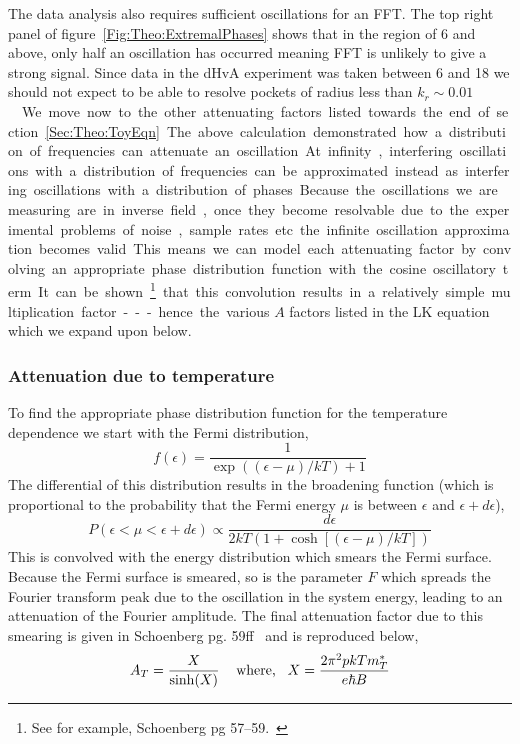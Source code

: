 The data analysis also requires sufficient oscillations for an \ac{FFT}. The top right panel of figure~\ref{Fig:Theo:ExtremalPhases} shows that in the region of \unit{6}{\tesla} and above, only half an oscillation has occurred meaning \ac{FFT} is unlikely to give a strong signal. Since data in the \ac{dHvA} experiment was taken between \unit{6}{\tesla} and \unit{18}{\tesla} we should not expect to be able to resolve pockets of radius less than \unit{$k_r\sim 0.01$}{\reciprocal\angstrom}.

We move now to the other attenuating factors listed towards the end of section~\ref{Sec:Theo:ToyEqn}. The above calculation demonstrated how a distribution of frequencies can attenuate an oscillation. At infinity, interfering oscillations with a distribution of frequencies can be approximated instead as interfering oscillations with a distribution of phases. Because the oscillations we are measuring are in inverse field, once they become resolvable due to the experimental problems of noise, sample rates etc. the infinite oscillation approximation becomes valid. This means we can model each attenuating factor by convolving an appropriate phase distribution function with the cosine oscillatory term. It can be shown\footnote{See for example, Schoenberg pg 57--59.~\cite{Schoenberg1984}} that this convolution results in a relatively simple multiplication factor --- hence the various $A$ factors listed in the \ac{LK} equation which we expand upon below.

\subsubsection{Attenuation due to temperature}

To find the appropriate phase distribution function for the temperature dependence we start with the Fermi distribution,
\begin{equation}
\label{Eqn:Theo:FermiFunction}
f(\epsilon) = \frac{1}{\exp\left((\epsilon-\mu)/kT\right) + 1}
\end{equation} 
The differential of this distribution results in the broadening function (which is proportional to the probability that the Fermi energy $\mu$ is between $\epsilon$ and $\epsilon + d\epsilon$),
\begin{equation}
  P(\epsilon < \mu < \epsilon + d\epsilon) \propto \frac{d\epsilon}{2kT(1 + \cosh[(\epsilon - \mu)/kT])}
\end{equation}
This is convolved with the energy distribution which smears the Fermi surface. Because the Fermi surface is smeared, so is the parameter $F$ which spreads the Fourier transform peak due to the oscillation in the system energy, leading to an attenuation of the Fourier amplitude. The final attenuation factor due to this smearing is given in Schoenberg pg. 59ff~\cite{Schoenberg1984} and is reproduced below,
\begin{equation}
\label{Eqn:Theo:TemperatureTerm}
  A_T = \frac{X}{\sinh(X)} \textrm{\hspace{0.3cm} where,\hspace{0.3cm}} X = \frac{2\pi^2pkT m^*_T}{e\hbar B}
\end{equation}

